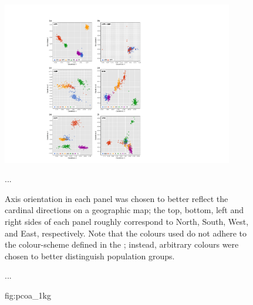 

\begin{figure}[p]
\centering
\includegraphics[width=0.9\textwidth]{./img/ch3/pcoa_1kg}
{...

Axis orientation in each panel was chosen to better reflect the cardinal directions on a geographic map; \ie the top, bottom, left and right sides of each panel roughly correspond to North, South, West, and East, respectively.
Note that the colours used do not adhere to the colour-scheme defined in the ; instead, arbitrary colours were chosen to better distinguish population groups.

...}
{fig:pcoa_1kg}
\end{figure}
